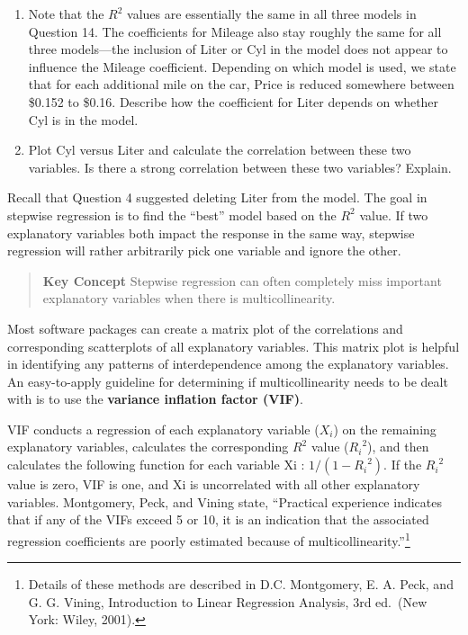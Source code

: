 \documentclass[
]{report}
\theoremstyle{definition}
\theoremstyle{definition}
\theoremstyle{definition}
\theoremstyle{definition}
\theoremstyle{remark}
\begin{document}
\begin{enumerate}
\def\labelenumi{\arabic{enumi}.}
\setcounter{enumi}{14}
\item
  Note that the \(R^2\) values are essentially the same in all three models in Question 14. The coefficients for Mileage also stay roughly the same for all three models---the inclusion of Liter or Cyl in the model does not appear to influence the Mileage coefficient. Depending on which model is used, we state that for each additional mile on the car, Price is reduced somewhere between \$0.152 to \$0.16. Describe how the coefficient for Liter depends on whether Cyl is in the model.
\item
  Plot Cyl versus Liter and calculate the correlation between these two variables. Is there a strong correlation between these two variables? Explain.
\end{enumerate}

Recall that Question 4 suggested deleting Liter from the model. The goal in stepwise regression is to find the ``best'' model based on the \(R^2\) value. If two explanatory variables both impact the response in the same way, stepwise regression will rather arbitrarily pick one variable and ignore the other.

\begin{quote}
\textbf{Key Concept}
Stepwise regression can often completely miss important explanatory variables when there is multicollinearity.
\end{quote}

Most software packages can create a matrix plot of the correlations and corresponding scatterplots of all explanatory variables. This matrix plot is helpful in identifying any patterns of interdependence among the explanatory variables. An easy-to-apply guideline for determining if multicollinearity needs to be dealt with is to use the \textbf{variance inflation factor (VIF)}.

VIF conducts a regression of each explanatory variable (\(X_i\)) on the remaining explanatory variables, calculates the corresponding \(R^2\) value (\({R_i}^2\)), and then calculates the following function for each variable Xi : \(1/(1 - {R_i}^2)\). If the \({R_i}^2\) value is zero, VIF is one, and Xi is uncorrelated with all other explanatory variables. Montgomery, Peck, and Vining state, ``Practical experience indicates that if any of the VIFs exceed 5 or 10, it is an indication that the associated regression coefficients are poorly estimated because of multicollinearity.''\footnote{Details of these methods are described in D.C. Montgomery, E. A. Peck, and G. G. Vining, Introduction to Linear Regression Analysis, 3rd ed.~(New York: Wiley, 2001).}
\end{document}
